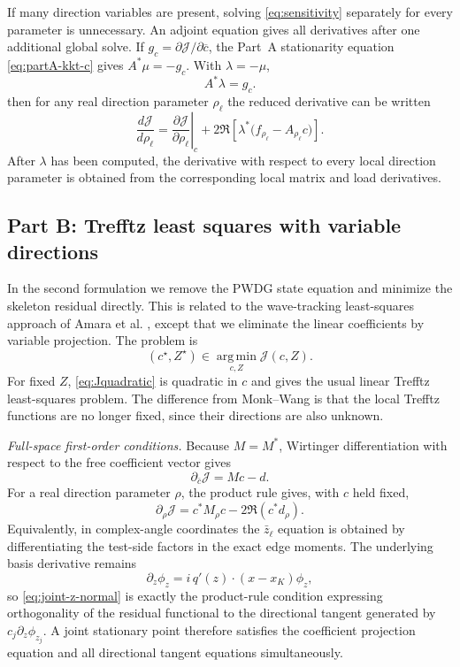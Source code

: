 \documentclass[pdflatex,sn-mathphys-num]{sn-jnl}
\theoremstyle{thmstyleone}
\theoremstyle{thmstyletwo}
\begin{document}
If many direction variables are present, solving \eqref{eq:sensitivity} separately for every parameter is unnecessary.  An adjoint equation gives all derivatives after one additional global solve.  If $g_c=\partial\mathcal J/\partial\overline c$, the Part~A stationarity equation \eqref{eq:partA-kkt-c} gives $A^*\mu=-g_c$.  With $\lambda=-\mu$,
\begin{equation}\label{eq:adjoint}
 A^*\lambda=g_c.
\end{equation}
then for any real direction parameter $\rho_\ell$ the reduced derivative can be written
\begin{equation}\label{eq:adjoint-gradient}
 \frac{d\mathcal J}{d\rho_\ell}
 =\left.\frac{\partial\mathcal J}{\partial\rho_\ell}\right|_{c}
 +2\Re\!\left[\lambda^*\big(f_{\rho_\ell}-A_{\rho_\ell}c\big)\right].
\end{equation}
After $\lambda$ has been computed, the derivative with respect to every local direction parameter is obtained from the corresponding local matrix and load derivatives.

\subsection{Part B: Trefftz least squares with variable directions}\label{subsec:jointls}
In the second formulation we remove the PWDG state equation and minimize the skeleton residual directly.  This is related to the wave-tracking least-squares approach of Amara et al. \cite{AmaraChaudhryDiazDjellouliFiedler2014}, except that we eliminate the linear coefficients by variable projection.  The problem is
\begin{equation}\label{eq:fullLS}
 {(c^\star,Z^\star)\in\operatorname*{arg\,min}_{c,Z}\mathcal J(c,Z).}
\end{equation}
For fixed $Z$, \eqref{eq:Jquadratic} is quadratic in $c$ and gives the usual linear Trefftz least-squares problem.  The difference from Monk--Wang is that the local Trefftz functions are no longer fixed, since their directions are also unknown.

\medskip\noindent\textit{Full-space first-order conditions.}
Because $M=M^*$, Wirtinger differentiation with respect to the free coefficient vector gives
\begin{equation}\label{eq:joint-c-normal}
 {\partial_{\bar c}\mathcal J=Mc-d.}
\end{equation}
For a real direction parameter $\rho$, the product rule gives, with $c$ held fixed,
\begin{equation}\label{eq:joint-z-normal}
 {\partial_\rho\mathcal J
 =c^*M_\rho c-2\Re(c^*d_\rho).}
\end{equation}
Equivalently, in complex-angle coordinates the $\bar z_\ell$ equation is obtained by differentiating the test-side factors in the exact edge moments.  The underlying basis derivative remains
\[
 \partial_z\phi_z=i\,q'(z)\cdot(x-x_K)\phi_z,
\]
so \eqref{eq:joint-z-normal} is exactly the product-rule condition expressing orthogonality of the residual functional to the directional tangent generated by $c_j\partial_z\phi_{z_j}$.  A joint stationary point therefore satisfies the coefficient projection equation and all directional tangent equations simultaneously.
\end{document}
